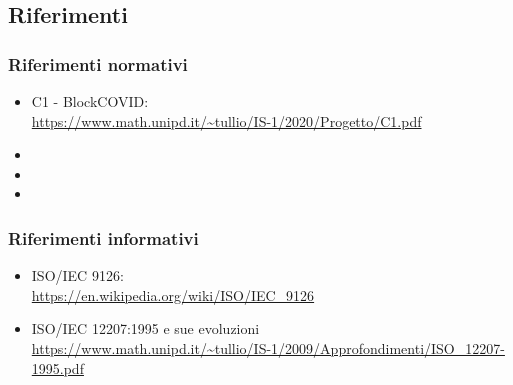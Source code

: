 \subsection{Riferimenti}

\subsubsection{Riferimenti normativi}
\begin{itemize}
\item C1 - BlockCOVID: \\
\url{https://www.math.unipd.it/~tullio/IS-1/2020/Progetto/C1.pdf}
\item {}
\item {}
\item {}
\end{itemize}
\subsubsection{Riferimenti informativi}
\begin{itemize}
\item ISO/IEC 9126: \\
\url{https://en.wikipedia.org/wiki/ISO/IEC_9126}
\item ISO/IEC 12207:1995 e sue evoluzioni \\
\url{https://www.math.unipd.it/~tullio/IS-1/2009/Approfondimenti/ISO_12207-1995.pdf}
\end{itemize}


